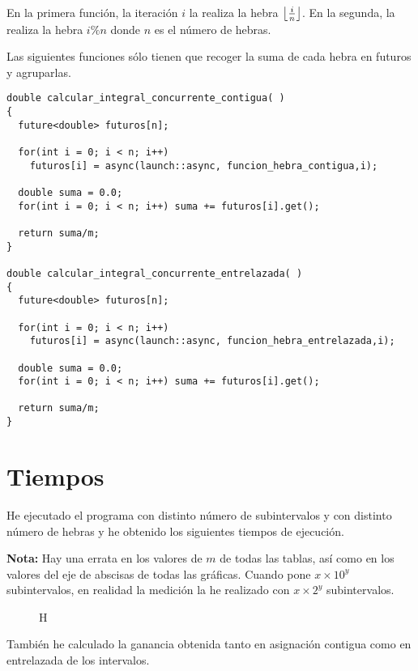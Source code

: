\documentclass[12pt,spanish]{article}
\DeclarePairedDelimiter\floor{\lfloor}{\rfloor}
\begin{document}
En la primera función, la iteración $i$ la realiza la hebra
$\floor*{\frac{i}{n}}$. En la segunda, la realiza la hebra $i\%n$
donde $n$ es el número de hebras.

Las siguientes funciones sólo tienen que recoger la suma de cada hebra
en futuros y agruparlas.

\begin{lstlisting}
double calcular_integral_concurrente_contigua( )
{
  future<double> futuros[n];

  for(int i = 0; i < n; i++)
    futuros[i] = async(launch::async, funcion_hebra_contigua,i);

  double suma = 0.0;
  for(int i = 0; i < n; i++) suma += futuros[i].get();
  
  return suma/m;
}

double calcular_integral_concurrente_entrelazada( )
{
  future<double> futuros[n];

  for(int i = 0; i < n; i++)
    futuros[i] = async(launch::async, funcion_hebra_entrelazada,i);

  double suma = 0.0;
  for(int i = 0; i < n; i++) suma += futuros[i].get();
  
  return suma/m;
}  
\end{lstlisting}

\section{Tiempos}
He ejecutado el programa con distinto número de subintervalos y con
distinto número de hebras y he obtenido los siguientes tiempos de
ejecución.

\textbf{Nota:} Hay una errata en los valores de $m$ de todas las
tablas, así como en los valores del eje de abscisas de todas las
gráficas. Cuando pone $x\times 10^y$ subintervalos, en realidad la
medición la he realizado con $x\times 2^y$ subintervalos.

\begin{figure}[H]
  \centering
\end{figure}

\begin{figure}{H}
  \centering
  \end{figure}

También he calculado la ganancia obtenida tanto en asignación
contigua como en entrelazada de los intervalos.
\end{document}
